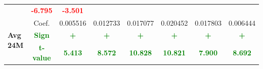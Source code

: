 \documentclass[11pt,english,a4paper,hidelinks]{book}
\begin{document}
\begin{table}[H]
\begin{tabular}{lccccccc}
            & \textbf{\textcolor{red}{-6.795}}
            & \textbf{\textcolor{red}{-3.501}} \\
        \cmidrule{1-8}
        \multirow{3}{*}{\textbf{Avg 24M}}
            & Coef.    & 0.005516  & 0.012733  & 0.017077  & 0.020452  & 0.017803  & 0.006444  \\
            & \textbf{\textcolor{green}{Sign}}
            & \textbf{\textcolor{green}{+}}
            & \textbf{\textcolor{green}{+}}
            & \textbf{\textcolor{green}{+}}
            & \textbf{\textcolor{green}{+}}
            & \textbf{\textcolor{green}{+}}
            & \textbf{\textcolor{green}{+}} \\
            & \textbf{\textcolor{green}{t-value}}
            & \textbf{\textcolor{green}{5.413}}
            & \textbf{\textcolor{green}{8.572}}
            & \textbf{\textcolor{green}{10.828}}
            & \textbf{\textcolor{green}{10.821}}
            & \textbf{\textcolor{green}{7.900}}
            & \textbf{\textcolor{green}{8.692}} \\
        \bottomrule
    \end{tabular}
    \label{tab:africa_middle_east_growth_consistency}
\end{table}
\end{document}
